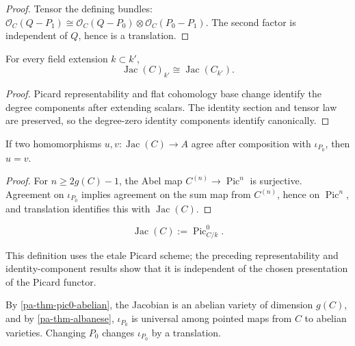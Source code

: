 \begin{proof}
  Tensor the defining bundles:
  \(\mathcal O_C(Q-P_1)\cong
    \mathcal O_C(Q-P_0)\otimes\mathcal O_C(P_0-P_1)\).
  The second factor is independent of \(Q\), hence is a translation.
\end{proof}

\begin{proposition}
  \label{pa-prop-jacobian-base-change}
  \cite{kleiman-picard}
  For every field extension \(k\subset k'\),
  \[
    \operatorname{Jac}(C)_{k'}\cong\operatorname{Jac}(C_{k'}).
  \]
\end{proposition}

\begin{proof}
  Picard representability and flat cohomology base change identify the degree
  components after extending scalars.  The identity section and tensor law are
  preserved, so the degree-zero identity components identify canonically.
\end{proof}

\begin{lemma}
  \label{pa-lem-universal-map-unique}
  \cite{milne-av}
  If two homomorphisms \(u,v:\operatorname{Jac}(C)\to A\) agree after
  composition with \(\iota_{P_0}\), then \(u=v\).
\end{lemma}

\begin{proof}
  For \(n\ge2g(C)-1\), the Abel map \(C^{(n)}\to\operatorname{Pic}^n\) is
  surjective.  Agreement on \(\iota_{P_0}\) implies agreement on the sum map
  from \(C^{(n)}\), hence on \(\operatorname{Pic}^n\), and translation
  identifies this with \(\operatorname{Jac}(C)\).
\end{proof}

\begin{definition}[Jacobian]
  \label{pa-def-jacobian}
  \cite{milne-av,kleiman-picard}
  \[
    \operatorname{Jac}(C):=\operatorname{Pic}^0_{C/k}.
  \]
\end{definition}

This definition uses the etale Picard scheme; the preceding representability
and identity-component results show that it is independent of the chosen
presentation of the Picard functor.

\begin{theorem}
  \label{pa-thm-jacobian}
  \cite{milne-av,kleiman-picard}
  By \ref{pa-thm-pic0-abelian}, the Jacobian is an abelian variety of dimension
  \(g(C)\), and by \ref{pa-thm-albanese}, \(\iota_{P_0}\) is universal among
  pointed maps from \(C\) to abelian varieties.  Changing \(P_0\) changes
  \(\iota_{P_0}\) by a translation.
\end{theorem}

